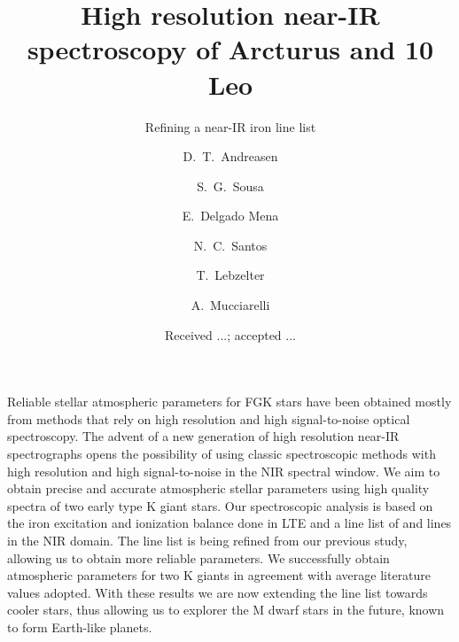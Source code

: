 \documentclass{aa}
\begin{document}
\title{High resolution near-IR spectroscopy of Arcturus and 10 Leo}
\subtitle{Refining a near-IR iron line list}


\author{ D.~T.~Andreasen
    \and S.~G.~Sousa
    \and E.~Delgado Mena
    \and N.~C.~Santos
    \and T.~Lebzelter
    \and A.~Mucciarelli}







\date{Received ...; accepted ...}

\abstract
{Reliable stellar atmospheric parameters for FGK stars have been obtained mostly
from methods that rely on high resolution and high signal-to-noise optical
spectroscopy. The advent of a new generation of high resolution near-IR
spectrographs opens the possibility of using classic spectroscopic methods with
high resolution and high signal-to-noise in the NIR spectral window.}
{We aim to obtain precise and accurate atmospheric stellar parameters using
high quality spectra of two early type K giant stars.}
{Our spectroscopic analysis is based on the iron excitation and ionization
balance done in LTE and a line list of  and  lines in the
NIR domain. The line list is being refined from our previous study, allowing us
to obtain more reliable parameters.}
{We successfully obtain atmospheric parameters for two K giants in agreement
with average literature values adopted.}
{With these results we are now extending the line list towards cooler stars,
thus allowing us to explorer the M dwarf stars in the future, known to form
Earth-like planets.}



\maketitle
\end{document}
